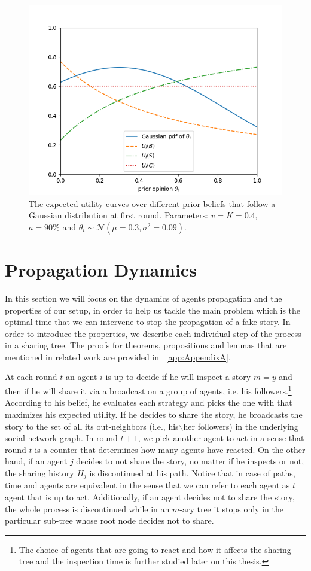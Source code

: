 \begin{figure}[t]
\centering
\includegraphics[width=.75\textwidth]{Figures/utilities.png}

\caption{The expected utility curves over different prior beliefs that follow a Gaussian distribution at first round. Parameters: $v=K=0.4$, $a=90\%$ and $\theta_i \sim \mathcal{N} (\mu=0.3,\sigma^2=0.09)$.}

\label{fig:utilities}
\end{figure}

\section{Propagation Dynamics}
\label{ch:Dynamics}

In this section we will focus on the dynamics of agents propagation and the properties of our setup, in order to help us tackle the main problem which is the optimal time that we can intervene to stop the propagation of a fake story. In order to introduce the properties, we describe each individual step of the process in a sharing tree. The proofs for theorems, propositions and lemmas that are mentioned in related work are provided in ~\ref{app:AppendixA}.

At each round $t$ an agent $i$ is up to decide if he will inspect a story $m=y$ and then if he will share it via a broadcast on a group of agents, i.e. his followers.\footnote{The choice of agents that are going to react and how it affects the sharing tree and the inspection time is further studied later on this thesis.} According to his belief, he evaluates each strategy and picks the one with that maximizes his expected utility. If he decides to share the story, he broadcasts the story to the set of all its out-neighbors (i.e., his$\backslash$her followers) in the underlying social-network graph. In round $t+1$, we pick another agent to act in a sense that round $t$ is a counter that determines how many agents have reacted. On the other hand, if an agent $j$ decides to not share the story, no matter if he inspects or not, the sharing history $H_j$ is discontinued at his path. Notice that in case of paths, time and agents are equivalent in the sense that we can refer to each agent as $t$ agent that is up to act. Additionally, if an agent decides not to share the story, the whole process is discontinued while in an $m$-ary tree it stops only in the particular sub-tree whose root node decides not to share. 

